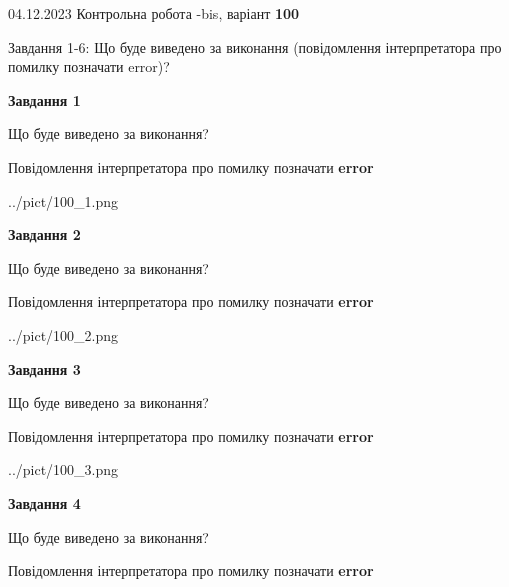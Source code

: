 \documentclass[12pt, ukrainian]{article}
\begin{document}
{{04.12.2023 Контрольна робота -bis, варіант  \No \textbf { 100 }\par}}
{

Завдання 1-6: Що буде виведено за виконання (повідомлення інтерпретатора про помилку позначати error)?


{\begin {center}\textbf{Завдання 1}\end {center}}\par
Що буде виведено за виконання? \par
Повідомлення інтерпретатора про помилку позначати \textbf{error}

\begin{center}
	{../pict/100_1.png}
\end{center}
\newpage

{\begin {center}\textbf{Завдання 2}\end {center}}\par
Що буде виведено за виконання? \par
Повідомлення інтерпретатора про помилку позначати \textbf{error}

\begin{center}
	{../pict/100_2.png}
\end{center}
\newpage

{\begin {center}\textbf{Завдання 3}\end {center}}\par
Що буде виведено за виконання? \par
Повідомлення інтерпретатора про помилку позначати \textbf{error}

\begin{center}
	{../pict/100_3.png}
\end{center}
\newpage

{\begin {center}\textbf{Завдання 4}\end {center}}\par
Що буде виведено за виконання? \par
Повідомлення інтерпретатора про помилку позначати \textbf{error}

}
\end{document}
